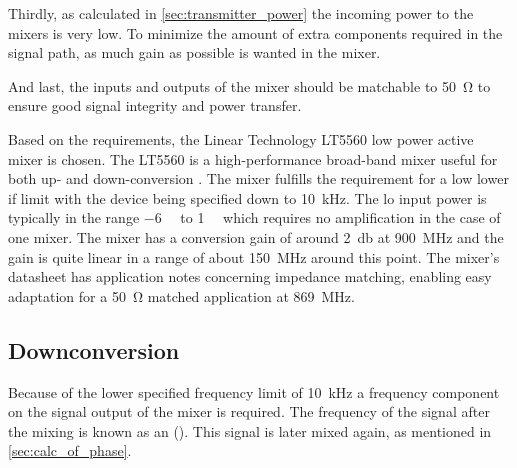 Thirdly, as calculated in \autoref{sec:transmitter_power} the incoming power to the mixers is very low. To minimize the amount of extra components required in the signal path, as much gain as possible is wanted in the mixer.

And last, the inputs and outputs of the mixer should be matchable to \SI{50}{\ohm} to ensure good signal integrity and power transfer.

Based on the requirements, the Linear Technology LT5560 low power active mixer is chosen. The LT5560 is a high-performance broad-band mixer useful for both up- and down-conversion \citep{datasheet:LT5560}. The mixer fulfills the requirement for a low lower \gls{if} limit with the device being specified down to \SI{10}{\kilo\hertz}. The \gls{lo} input power is typically in the range \SI{-6}{\deci\belm} to \SI{1}{\deci\belm} which requires no amplification in the case of one mixer. The mixer has a conversion gain of around \SI{2}{\decibel} at \SI{900}{\mega\hertz} and the gain is quite linear in a range of about \SI{150}{\mega\hertz} around this point. The mixer's datasheet \citep{datasheet:LT5560} has application notes concerning impedance matching, enabling easy adaptation for a \SI{50}{\ohm} matched application at \SI{869}{\mega\hertz}. 

\subsection{Downconversion} \label{subsec:downconversion}
Because of the lower specified frequency limit of \SI{10}{\kilo\hertz} a frequency component on the signal output of the mixer is required. The frequency of the signal after the mixing is known as an  (). This signal is later mixed again, as mentioned in \autoref{sec:calc_of_phase}.


